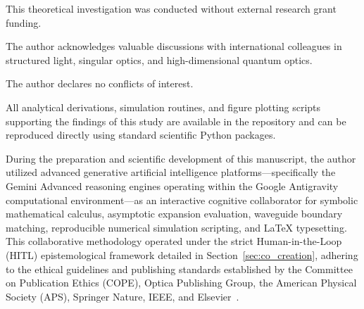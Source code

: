 \documentclass{optica-article}
\begin{document}
\begin{backmatter}
This theoretical investigation was conducted without external research grant funding.

The author acknowledges valuable discussions with international colleagues in structured light, singular optics, and high-dimensional quantum optics.

The author declares no conflicts of interest.

All analytical derivations, simulation routines, and figure plotting scripts supporting the findings of this study are available in the repository and can be reproduced directly using standard scientific Python packages.

During the preparation and scientific development of this manuscript, the author utilized advanced generative artificial intelligence platforms---specifically the Gemini Advanced reasoning engines operating within the Google Antigravity computational environment---as an interactive cognitive collaborator for symbolic mathematical calculus, asymptotic expansion evaluation, waveguide boundary matching, reproducible numerical simulation scripting, and LaTeX typesetting. This collaborative methodology operated under the strict Human-in-the-Loop (HITL) epistemological framework detailed in Section~\ref{sec:co_creation}, adhering to the ethical guidelines and publishing standards established by the Committee on Publication Ethics (COPE), Optica Publishing Group, the American Physical Society (APS), Springer Nature, IEEE, and Elsevier~\cite{Jauhiainen2026,Haber2025,OToole2024,VillaescusaNavarro2026,Chandra2026TheoPhysEval,Kacena2024}.
\end{backmatter}


\end{document}
